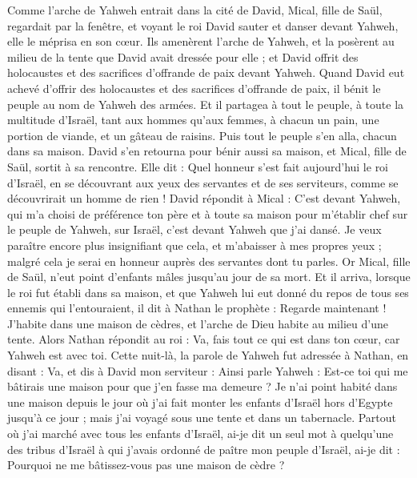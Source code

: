 \begin{multicols}{2}
Comme l'arche de Yahweh entrait dans la cité de David, Mical, fille de Saül, regardait par la fenêtre, et voyant le roi David sauter et danser devant Yahweh, elle le méprisa en son cœur.
Ils amenèrent l'arche de Yahweh, et la posèrent au milieu de la tente que David avait dressée pour elle ; et David offrit des holocaustes et des sacrifices d’offrande de paix devant Yahweh.
Quand David eut achevé d'offrir des holocaustes et des sacrifices d'offrande de paix, il bénit le peuple au nom de Yahweh des armées.
Et il partagea à tout le peuple, à toute la multitude d'Israël, tant aux hommes qu'aux femmes, à chacun un pain, une portion de viande, et un gâteau de raisins. Puis tout le peuple s'en alla, chacun dans sa maison.
David s'en retourna pour bénir aussi sa maison, et Mical, fille de Saül, sortit à sa rencontre. Elle dit : Quel honneur s'est fait aujourd'hui le roi d'Israël, en se découvrant aux yeux des servantes et de ses serviteurs, comme se découvrirait un homme de rien !
David répondit à Mical : C’est devant Yahweh, qui m'a choisi de préférence ton père et à toute sa maison pour m’établir chef sur le peuple de Yahweh, sur Israël, c'est devant Yahweh que j’ai dansé.
Je veux paraître encore plus insignifiant que cela, et m'abaisser à mes propres yeux ; malgré cela je serai en honneur auprès des servantes dont tu parles.
Or Mical, fille de Saül, n'eut point d’enfants mâles jusqu'au jour de sa mort.
\VerseOne{}Et il arriva, lorsque le roi fut établi dans sa maison, et que Yahweh lui eut donné du repos de tous ses ennemis qui l’entouraient,
il dit à Nathan le prophète : Regarde maintenant ! J'habite dans une maison de cèdres, et l'arche de Dieu habite au milieu d’une tente.
Alors Nathan répondit au roi : Va, fais tout ce qui est dans ton cœur, car Yahweh est avec toi.
Cette nuit-là, la parole de Yahweh fut adressée à Nathan, en disant :
Va, et dis à David mon serviteur : Ainsi parle Yahweh : Est-ce toi qui me bâtirais une maison pour que j'en fasse ma demeure ?
Je n'ai point habité dans une maison depuis le jour où j'ai fait monter les enfants d'Israël hors d'Egypte jusqu'à ce jour ; mais j'ai voyagé sous une tente et dans un tabernacle.
Partout où j'ai marché avec tous les enfants d'Israël, ai-je dit un seul mot à quelqu'une des tribus d'Israël à qui j’avais ordonné de paître mon peuple d'Israël, ai-je dit : Pourquoi ne me bâtissez-vous pas une maison de cèdre ?

\end{multicols}
